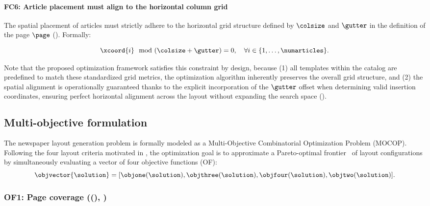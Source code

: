 \paragraph{FC6: Article placement must align to the horizontal column grid}
 The spatial placement of articles must strictly adhere to the horizontal grid structure defined by $\colsize$ and $\gutter$ in the definition of the page $\page$ (). Formally: 

 \begin{equation}
    \xcoord{i} \mod (\colsize + \gutter) = 0, \quad \forall i \in \{1, \dots, \numarticles\}.
    \label{eq:grid_alignment}
\end{equation}

 Note that the proposed optimization framework satisfies this constraint by design, because (1) all templates within the catalog are predefined to match these standardized grid metrics, the optimization algorithm inherently preserves the overall grid structure, and (2) the spatial alignment is operationally guaranteed thanks to the explicit incorporation of the $\gutter$ offset when determining valid insertion coordinates, ensuring perfect horizontal alignment across the layout without expanding the search space ().




\subsection{Multi-objective formulation}
\label{sec:objective_formulation}

The newspaper layout generation problem is formally modeled as a Multi-Objective Combinatorial Optimization Problem (MOCOP). Following the four layout criteria motivated in , the optimization goal is to approximate a Pareto-optimal frontier~\cite{pareto} of layout configurations by simultaneously evaluating a vector of four objective functions (OF): 
\begin{equation}
\objvector{\solution} = [\objone(\solution), \objthree(\solution), \objfour(\solution), \objtwo(\solution)].
\end{equation}

\subsubsection{OF1: Page coverage (\objone(\solution), )}

